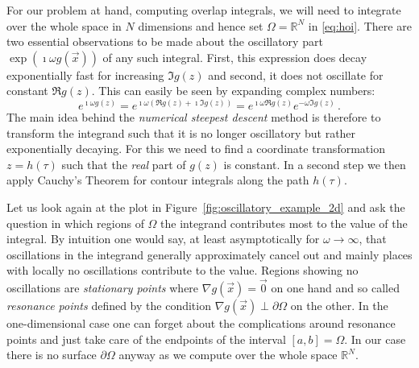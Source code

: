 \documentclass[a4paper,10pt]{article}
\begin{document}
For our problem at hand, computing overlap integrals, we will need to integrate
over the whole space in $N$ dimensions and hence set $\Omega = \mathbb{R}^N$ in
\eqref{eq:hoi}.
There are two essential observations to be made about the
oscillatory part $\exp\left(\imath \omega g\left(\vec{x}\right) \right)$
of any such integral. First, this expression does decay exponentially
fast for increasing $\Im g(z)$ and second, it does not oscillate for
constant $\Re g(z)$. This can easily be seen by expanding complex numbers:
\begin{equation*}
  e^{\imath \omega g(z)}
  =
  e^{\imath \omega (\Re g(z) + \imath \Im g(z))}
  =
  e^{\imath \omega \Re g(z)}
  e^{- \omega \Im g(z)} \,.
\end{equation*}
The main idea behind the \emph{numerical steepest descent} method is therefore
to transform the integrand such that it is no longer oscillatory but
rather exponentially decaying. For this we need to find a coordinate
transformation $z = h(\tau)$ such that the \emph{real} part of $g(z)$
is constant. In a second step we then apply Cauchy's Theorem for contour
integrals along the path $h(\tau)$.

Let us look again at the plot in Figure~\ref{fig:oscillatory_example_2d}
and ask the question in which regions of $\Omega$ the integrand contributes most
to the value of the integral. By intuition one would say, at least asymptotically
for $\omega \rightarrow \infty$, that oscillations in the integrand generally approximately
cancel out and mainly places with locally no oscillations contribute to the value.
Regions showing no oscillations are \emph{stationary points} where
$\nabla g(\vec{x}) = \vec{0}$ on one hand and so called \emph{resonance points}
defined by the condition $\nabla g(\vec{x}) \perp \partial \Omega$ on the other.
In the one-dimensional case one can forget about the complications around resonance
points and just take care of the endpoints of the interval $[a, b] = \Omega$. In our
case there is no surface $\partial \Omega$ anyway as we compute over the whole space
$\mathbb{R}^N$.
\end{document}
